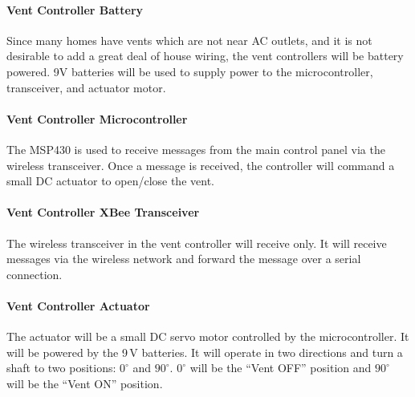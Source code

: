 \paragraph{Vent Controller Battery}
Since many homes have vents which are not near AC outlets, and it is not desirable to add a great deal of house wiring, the vent controllers will be battery powered.  9V batteries will be used to supply power to the microcontroller, transceiver, and actuator motor.
\paragraph{Vent Controller Microcontroller}
The MSP430 is used to receive messages from the main control panel via the wireless transceiver.  Once a message is received, the controller will command a small DC actuator to open/close the vent.
\paragraph{Vent Controller XBee Transceiver}
The wireless transceiver in the vent controller will receive only. It will receive messages via the wireless network and forward the message over a serial connection.
\paragraph{Vent Controller Actuator}
The actuator will be a small DC servo motor controlled by the microcontroller.  It will be powered by the 9\,V batteries.  It will operate in two directions and turn a shaft to two positions: $0^\circ$ and $90^\circ$. $0^\circ$ will be the ``Vent OFF'' position and $90^\circ$ will be the ``Vent ON'' position.

